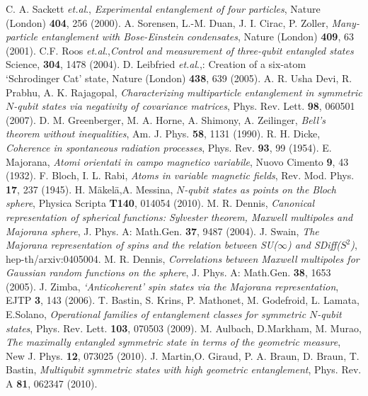 {\begin{thebibliography}{0}
 C. A. Sackett {\it{et.al}}., {\em Experimental entanglement of four particles},  Nature (London) {\bf{404}}, 256 (2000).
 A. Sorensen, L.-M. Duan, J. I. Cirac, P. Zoller, {\em Many-particle entanglement with
Bose-Einstein condensates}, Nature (London) {\bf{409}}, 63 (2001).
C.F. Roos  {\it{et.al}}.,{\em Control and measurement of three-qubit entangled states} Science, {\bf{304}}, 1478 (2004).
 D. Leibfried  {\it{et.al}}.,: Creation of a six-atom `Schrodinger Cat' state, Nature (London) {\bf{438}}, 639 (2005).
 A. R. Usha Devi, R. Prabhu,  A. K. Rajagopal, {\em Characterizing multiparticle entanglement in symmetric $N$-qubit states
via negativity of covariance matrices}, Phys. Rev. Lett. {\bf{98}}, 060501 (2007).  
 D. M. Greenberger, M. A. Horne, A. Shimony, A. Zeilinger, {\em Bell's theorem without inequalities}, Am. J. Phys. {\bf 58}, 1131 (1990).
 R. H. Dicke,  {\em Coherence in spontaneous radiation processes}, Phys. Rev. {\bf 93}, 99 (1954).
 E. Majorana, {\em Atomi orientati in campo magnetico variabile}, Nuovo Cimento {\bf 9}, 43  (1932). 
 F. Bloch, I. L. Rabi, {\em  Atoms in variable magnetic fields}, Rev. Mod. Phys. {\bf 17}, 237 (1945).
  H. M{\"a}kel{\"a},A.  Messina, {\em  $N$-qubit states as points on the
Bloch sphere}, Physica Scripta {\bf T140}, 014054 (2010). 
 M. R. Dennis, {\em  Canonical representation of spherical functions:
Sylvester theorem, Maxwell multipoles and Majorana sphere}, J. Phys. A: Math.Gen. {\bf 37}, 9487 (2004).
 J. Swain, {\em The Majorana representation of spins and the relation between
SU($\infty$) and SDiff($S^2$)}, hep-th/arxiv:0405004.  
  M. R. Dennis, {\em Correlations between Maxwell multipoles for
Gaussian random functions on the sphere}, J. Phys. A: Math.Gen. {\bf 38}, 1653 (2005).
 J. Zimba, {\em `Anticoherent' spin states via the
Majorana representation},  EJTP {\bf 3}, 143 (2006).
  T. Bastin, S. Krins, P. Mathonet, M. Godefroid, L. Lamata, E.Solano, {\em Operational families of entanglement classes for symmetric $N$-qubit states}, Phys. Rev. Lett. {\bf 103},  070503 (2009).
 M. Aulbach, D.Markham,  M. Murao, {\em The maximally entangled symmetric state in terms of
the geometric measure}, New J. Phys. {\bf 12}, 073025 (2010).
 J. Martin,O. Giraud, P. A. Braun, D. Braun, T. Bastin, {\em Multiqubit symmetric states with high geometric entanglement}, Phys. Rev. A {\bf 81}, 062347 (2010).

\end{thebibliography}}
